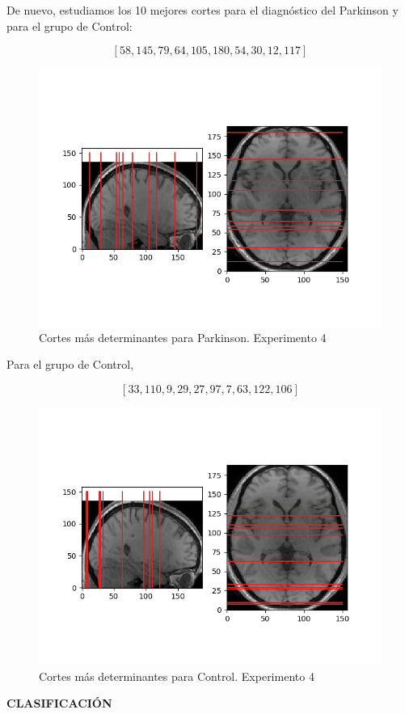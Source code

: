 De nuevo, estudiamos los 10 mejores cortes para el diagnóstico del Parkinson y para el grupo de Control:

$$[58, 145, 79, 64, 105, 180, 54, 30, 12, 117]$$

\begin{figure}[H] %
	\centering
	\includegraphics[scale=0.8]{cortes-PD-exp4.png}  %
	\caption{Cortes más determinantes para Parkinson. Experimento 4} 
	\label{fig:cortes-PD-exp4}
\end{figure}

Para el grupo de Control,

$$[33, 110, 9, 29, 27, 97, 7, 63, 122, 106]$$

\begin{figure}[H] %
	\centering
	\includegraphics[scale=0.8]{cortes-C-exp4.png}  %
	\caption{Cortes más determinantes para Control. Experimento 4} 
	\label{fig:cortes-C-exp4}
\end{figure}
\newpage
\textbf{CLASIFICACIÓN}

